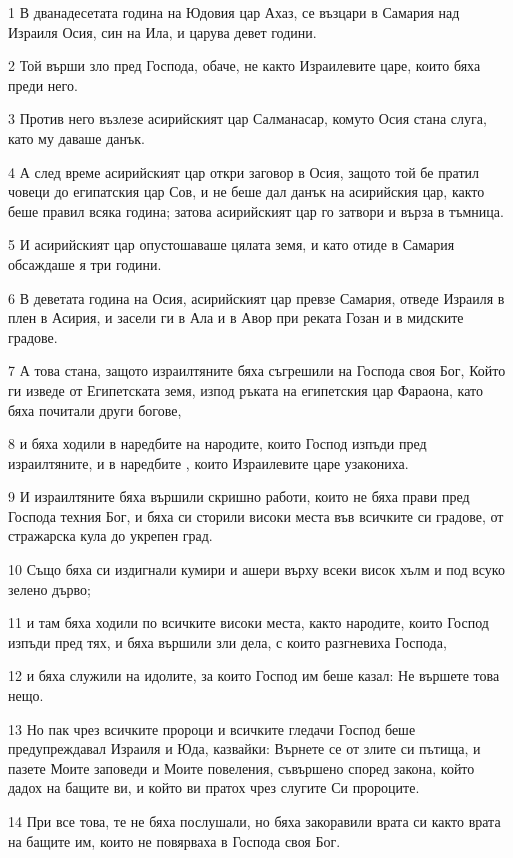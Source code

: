 \par 1 В дванадесетата година на Юдовия цар Ахаз, се възцари в Самария над Израиля Осия, син на Ила, и царува девет години.
\par 2 Той върши зло пред Господа, обаче, не както Израилевите царе, които бяха преди него.
\par 3 Против него възлезе асирийският цар Салманасар, комуто Осия стана слуга, като му даваше данък.
\par 4 А след време асирийският цар откри заговор в Осия, защото той бе пратил човеци до египатския цар Сов, и не беше дал данък на асирийския цар, както беше правил всяка година; затова асирийският цар го затвори и върза в тъмница.
\par 5 И асирийският цар опустошаваше цялата земя, и като отиде в Самария обсаждаше я три години.
\par 6 В деветата година на Осия, асирийският цар превзе Самария, отведе Израиля в плен в Асирия, и засели ги в Ала и в Авор при реката Гозан и в мидските градове.
\par 7 А това стана, защото израилтяните бяха съгрешили на Господа своя Бог, Който ги изведе от Египетската земя, изпод ръката на египетския цар Фараона, като бяха почитали други богове,
\par 8 и бяха ходили в наредбите на народите, които Господ изпъди пред израилтяните, и в наредбите , които Израилевите царе узакониха.
\par 9 И израилтяните бяха вършили скришно работи, които не бяха прави пред Господа техния Бог, и бяха си сторили високи места във всичките си градове, от стражарска кула до укрепен град.
\par 10 Също бяха си издигнали кумири и ашери върху всеки висок хълм и под всуко зелено дърво;
\par 11 и там бяха ходили по всичките високи места, както народите, които Господ изпъди пред тях, и бяха вършили зли дела, с които разгневиха Господа,
\par 12 и бяха служили на идолите, за които Господ им беше казал: Не вършете това нещо.
\par 13 Но пак чрез всичките пророци и всичките гледачи Господ беше предупреждавал Израиля и Юда, казвайки: Върнете се от злите си пътища, и пазете Моите заповеди и Моите повеления, съвършено според закона, който дадох на бащите ви, и който ви пратох чрез слугите Си пророците.
\par 14 При все това, те не бяха послушали, но бяха закоравили врата си както врата на бащите им, които не повярваха в Господа своя Бог.
